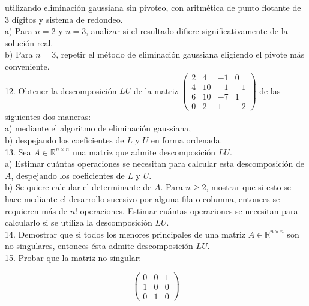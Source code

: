 \documentclass[10pt]{book}
\begin{document}
utilizando eliminación gaussiana sin pivoteo, con aritmética de punto flotante de 3 dígitos y sistema de redondeo.\\
a) Para $n=2$ y $n=3$, analizar si el resultado difiere significativamente de la solución real.\\
b) Para $n=3$, repetir el método de eliminación gaussiana eligiendo el pivote más conveniente.\\
12. Obtener la descomposición $L U$ de la matriz $\left(\begin{array}{cccc}2 & 4 & -1 & 0 \\ 4 & 10 & -1 & -1 \\ 6 & 10 & -7 & 1 \\ 0 & 2 & 1 & -2\end{array}\right)$ de las siguientes dos maneras:\\
a) mediante el algoritmo de eliminación gaussiana,\\
b) despejando los coeficientes de $L$ y $U$ en forma ordenada.\\
13. Sea $A \in \mathbb{R}^{n \times n}$ una matriz que admite descomposición $L U$.\\
a) Estimar cuántas operaciones se necesitan para calcular esta descomposición de $A$, despejando los coeficientes de $L$ y $U$.\\
b) Se quiere calcular el determinante de $A$. Para $n \geq 2$, mostrar que si esto se hace mediante el desarrollo sucesivo por alguna fila o columna, entonces se requieren más de $n!$ operaciones. Estimar cuántas operaciones se necesitan para calcularlo si se utiliza la descomposición $L U$.\\
14. Demostrar que si todos los menores principales de una matriz $A \in \mathbb{R}^{n \times n}$ son no singulares, entonces ésta admite descomposición $L U$.\\
15. Probar que la matriz no singular:

$$
\left(\begin{array}{lll}
0 & 0 & 1 \\
1 & 0 & 0 \\
0 & 1 & 0
\end{array}\right)
$$
\end{document}
